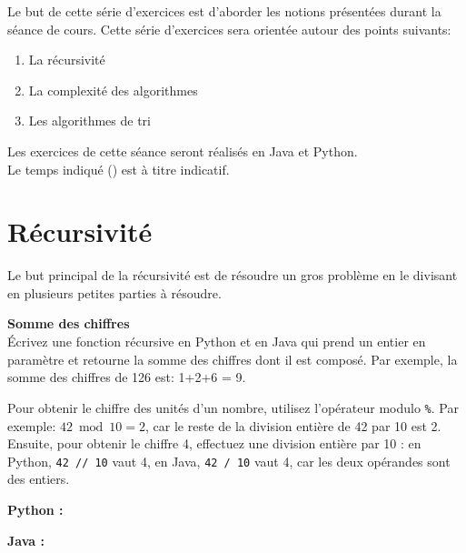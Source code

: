 
\usepackage[T1]{fontenc}
\usepackage{float}
\usepackage{tikz}
\usetikzlibrary{arrows.meta, positioning, babel}




\ShowSolutiontrue
\ShowConseiltrue
\titre
{}

Le but de cette série d'exercices est d'aborder les notions présentées durant la séance de cours. Cette série d'exercices sera orientée autour des points suivants:
\begin{enumerate}
    \item La récursivité
    \item La complexité des algorithmes
    \item Les algorithmes de tri
\end{enumerate}

Les exercices de cette séance seront réalisés en Java et Python. \\

Le temps indiqué (\faClock) est à titre indicatif.

\section{Récursivité}

Le but principal de la récursivité est de résoudre un gros problème en le divisant en plusieurs petites parties à résoudre. \\

\begin{Exercice}[10 minutes] \textbf{Somme des chiffres} \\
    Écrivez une fonction récursive en Python et en Java qui prend un entier en paramètre et retourne la somme des chiffres dont il est composé. Par exemple, la somme des chiffres de 126 est: 1+2+6 = 9.
    
    \begin{conseil}
    Pour obtenir le chiffre des unités d'un nombre, utilisez l'opérateur modulo \texttt{\%}. Par exemple: $42 \bmod 10 = 2$, car le reste de la division entière de 42 par 10 est 2.
    Ensuite, pour obtenir le chiffre 4, effectuez une division entière par 10 : en Python, \texttt{42 // 10} vaut 4, en Java, \texttt{42 / 10} vaut 4, car les deux opérandes sont des entiers.
    \end{conseil}
    
    \begin{solution}
    \textbf{Python :}
        
                
    \textbf{Java :}
       
    
    \end{solution}
\end{Exercice}

